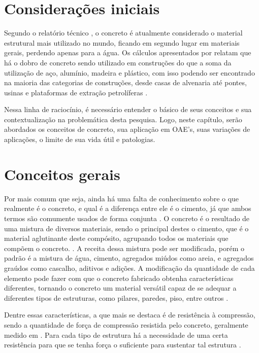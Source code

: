 \section{Considerações iniciais}

Segundo o relatório técnico , o concreto é atualmente considerado o material estrutural mais utilizado no mundo, ficando em segundo lugar em materiais gerais, perdendo apenas para a água. 
Os cálculos apresentados por  relatam que há o dobro de concreto sendo utilizado em construções do que a soma da utilização de aço, alumínio, madeira e plástico, com isso podendo ser encontrado na maioria das categorias de construções, desde casas de alvenaria até pontes, usinas e plataformas de extração petrolíferas \cite{Lima2014}.

Nessa linha de raciocínio, é necessário entender o básico de seus conceitos e sua contextualização na problemática desta pesquisa. Logo, neste capítulo, serão abordados os conceitos de concreto, sua aplicação em OAE's, suas variações de aplicações, o limite de sua vida útil e patologias.

\section{Conceitos gerais}

Por mais comum que seja, ainda há uma falta de conhecimento sobre o que realmente é o concreto, e qual é a diferença entre ele é o cimento, já que ambos termos são comumente usados de forma conjunta \cite{Gagg2014}. 
O concreto é o resultado de uma mistura de diversos materiais, sendo o principal destes o cimento, que é o material aglutinante deste compósito, agrupando todos os materiais que compõem o concreto. \cite{allen2019fundamentals}.
A receita dessa mistura pode ser modificada, porém o padrão é a mistura de água, cimento, agregados miúdos como areia, e agregados graúdos como cascalho, aditivos e adições. 
A modificação da quantidade de cada elemento pode fazer com que o concreto fabricado obtenha características diferentes, tornando o concreto um material versátil capaz de se adequar a diferentes tipos de estruturas, como pilares, paredes, piso, entre outros \cite{Gagg2014}.

Dentre essas características, a que mais se destaca é de resistência à compressão, sendo a quantidade de força de compressão resistida pelo concreto, geralmente medido em  \cite{pinheiro2007fundamentos}. 
Para cada tipo de estrutura há a necessidade de uma certa resistência para que se tenha força o suficiente para sustentar tal estrutura \cite{izharcomparison}.



